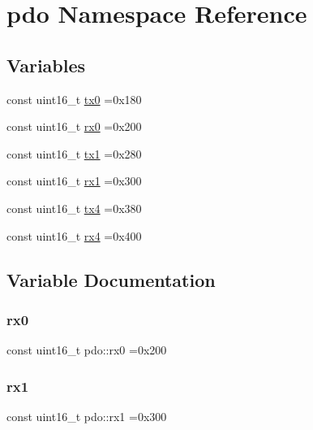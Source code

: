 \hypertarget{namespacepdo}{}\section{pdo Namespace Reference}
\label{namespacepdo}
\subsection*{Variables}
\begin{DoxyCompactItemize}
\item 
const uint16\+\_\+t \hyperlink{namespacepdo_a4a8e678f87bbe2520c5cffe3f6a6dae0}{tx0} =0x180
\item 
const uint16\+\_\+t \hyperlink{namespacepdo_a3a8ecb285207c4eb0b05bc69762404cf}{rx0} =0x200
\item 
const uint16\+\_\+t \hyperlink{namespacepdo_ae5f87d5007685cfd9d219e1cb051ccf0}{tx1} =0x280
\item 
const uint16\+\_\+t \hyperlink{namespacepdo_a1388fefc691ccce0ef2ea8347f737d1d}{rx1} =0x300
\item 
const uint16\+\_\+t \hyperlink{namespacepdo_a12b62b143e83e83b2566dea6d20a169a}{tx4} =0x380
\item 
const uint16\+\_\+t \hyperlink{namespacepdo_ab45e1d027abca75c1d406d514d3f6085}{rx4} =0x400
\end{DoxyCompactItemize}


\subsection{Variable Documentation}
\mbox{\label{namespacepdo_a3a8ecb285207c4eb0b05bc69762404cf}} 
\subsubsection{\texorpdfstring{rx0}{rx0}}
{\footnotesize\ttfamily const uint16\+\_\+t pdo\+::rx0 =0x200}

\mbox{\label{namespacepdo_a1388fefc691ccce0ef2ea8347f737d1d}} 
\subsubsection{\texorpdfstring{rx1}{rx1}}
{\footnotesize\ttfamily const uint16\+\_\+t pdo\+::rx1 =0x300}

